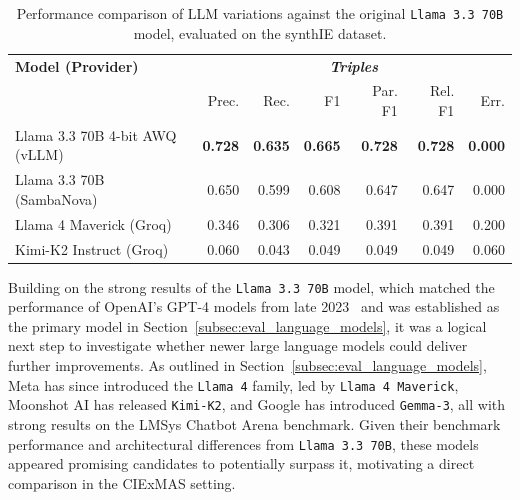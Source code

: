 \documentclass[a4paper,oneside,bibliography=totoc]{scrbook}
\begin{document}
\begin{table}[h]
  \centering
  \begin{tabular}{p{5cm}|rrrrrr}
    \toprule
    \textbf{Model (Provider)}      & \multicolumn{6}{c}{\textit{\textbf{Triples}}}                                                                                      \\
                                   & Prec.                                         & Rec.           & F1             & Par. F1        & Rel. F1        & Err.           \\
    \midrule
    Llama 3.3 70B 4-bit AWQ (vLLM) & \textbf{0.728}                                & \textbf{0.635} & \textbf{0.665} & \textbf{0.728} & \textbf{0.728} & \textbf{0.000} \\
    Llama 3.3 70B (SambaNova)      & 0.650                                         & 0.599          & 0.608          & 0.647          & 0.647          & 0.000          \\
    Llama 4 Maverick (Groq)        & 0.346                                         & 0.306          & 0.321          & 0.391          & 0.391          & 0.200          \\
    Kimi-K2 Instruct (Groq)        & 0.060                                         & 0.043          & 0.049          & 0.049          & 0.049          & 0.060          \\
    \bottomrule
  \end{tabular}
  \caption{Performance comparison of \ac{LLM} variations against the original \texttt{Llama 3.3 70B} model, evaluated on the synthIE dataset.}
  \label{tab:model_variation_comparison}
\end{table}

Building on the strong results of the \texttt{Llama 3.3 70B} model, which matched the performance of OpenAI’s GPT-4 models from late 2023~\cite{Chiang2024} and was established as the primary model in Section~\ref{subsec:eval_language_models}, it was a logical next step to investigate whether newer large language models could deliver further improvements. As outlined in Section~\ref{subsec:eval_language_models}, Meta has since introduced the \texttt{Llama 4} family, led by \texttt{Llama 4 Maverick}, Moonshot AI has released \texttt{Kimi-K2}, and Google has introduced \texttt{Gemma-3}, all with strong results on the LMSys Chatbot Arena benchmark. Given their benchmark performance and architectural differences from \texttt{Llama 3.3 70B}, these models appeared promising candidates to potentially surpass it, motivating a direct comparison in the CIExMAS setting.
\end{document}
